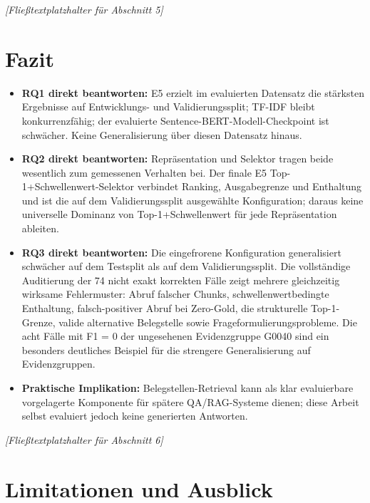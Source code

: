 \documentclass[11pt]{article}
\begin{document}
\textit{[Fließtextplatzhalter für Abschnitt 5]}


\section{Fazit}

\begin{leitfragenbox}
\begin{itemize}
    \item \textbf{RQ1 direkt beantworten:} E5 erzielt im evaluierten Datensatz die st\"arksten Ergebnisse auf Entwicklungs- und Validierungssplit; TF-IDF bleibt konkurrenzf\"ahig; der evaluierte Sentence-BERT-Modell-Checkpoint ist schw\"acher. Keine Generalisierung \"uber diesen Datensatz hinaus.
    \item \textbf{RQ2 direkt beantworten:} Repräsentation und Selektor tragen beide wesentlich zum gemessenen Verhalten bei. Der finale E5 Top-1+Schwellenwert-Selektor verbindet Ranking, Ausgabegrenze und Enthaltung und ist die auf dem Validierungssplit ausgewählte Konfiguration; daraus keine universelle Dominanz von Top-1+Schwellenwert f\"ur jede Repr\"asentation ableiten.
    \item \textbf{RQ3 direkt beantworten:} Die eingefrorene Konfiguration generalisiert schw\"acher auf dem Testsplit als auf dem Validierungssplit. Die vollst\"andige Auditierung der 74 nicht exakt korrekten Fälle zeigt mehrere gleichzeitig wirksame Fehlermuster: Abruf falscher Chunks, schwellenwertbedingte Enthaltung, falsch-positiver Abruf bei Zero-Gold, die strukturelle Top-1-Grenze, valide alternative Belegstelle sowie Frageformulierungsprobleme. Die acht Fälle mit F1 = 0 der ungesehenen Evidenzgruppe G0040 sind ein besonders deutliches Beispiel f\"ur die strengere Generalisierung auf Evidenzgruppen.
    \item \textbf{Praktische Implikation:} Belegstellen-Retrieval kann als klar evaluierbare vorgelagerte Komponente f\"ur sp\"atere QA/RAG-Systeme dienen; diese Arbeit selbst evaluiert jedoch keine generierten Antworten.
\end{itemize}
\end{leitfragenbox}

\textit{[Fließtextplatzhalter für Abschnitt 6]}


\section{Limitationen und Ausblick}
\end{document}
